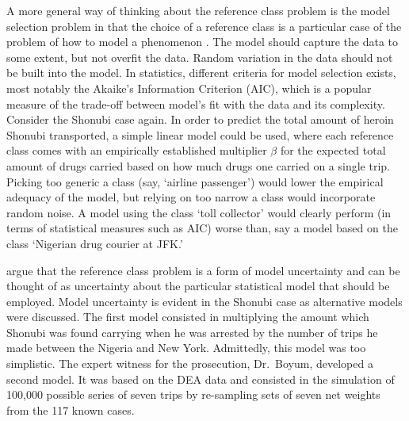 \documentclass{article}
\begin{document}
A more general way of thinking about the reference class problem is the model selection problem
in that the choice of a reference class is a particular case of the problem of how to model a phenomenon \citep{cheng2009practical}. %
The model should capture the data to some extent, but not overfit the data. Random variation in the data should not be built into the model. %
In statistics, different criteria for model selection exists, most notably the Akaike's Information Criterion (AIC), which is a popular measure of the trade-off between  model's fit with the data and its complexity. %
Consider the Shonubi case again. In order to predict the total amount of heroin Shonubi transported, a simple linear model could be used, where each reference \textsf{class} comes with an   empirically established multiplier $\beta$ for the expected total amount of drugs carried based on how much drugs one carried on a single trip. Picking too generic a class (say, `airline passenger') would lower the empirical adequacy of the model, but relying on too narrow a class would incorporate random noise. A model using the class `\textsf{toll collector}' would clearly  perform (in terms of statistical measures  such as AIC) worse than, say a model based on the class `\textsf{Nigerian drug courier at JFK}.' 



	
	
	
 \citet{colyvan2007legal} argue that the
reference class problem is a form of model uncertainty and can be thought of as uncertainty about the particular statistical model that should be employed. %
Model uncertainty is evident in the Shonubi case as alternative models were discussed.
 The first model consisted in multiplying the amount which Shonubi was found carrying when he was arrested by the number of trips he made between the Nigeria and New York. Admittedly, this model was too simplistic. The expert witness for the prosecution, Dr.\ Boyum, developed a second model. It was based on the DEA data and consisted in the simulation of 100,000 possible series of seven trips by re-sampling sets of seven net weights from the 117 known cases. 
 
\end{document}
